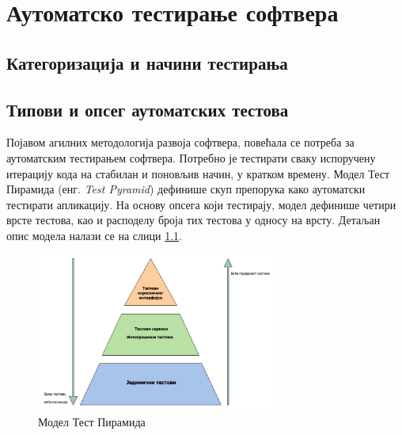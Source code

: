 \documentclass[12pt,oneside]{memoir}
\begin{document}




\chapter{Аутоматско тестирање софтвера}
\label{chp:testiranje}







\section{Категоризација и начини тестирања}





\section{Типови и опсег аутоматских тестова}

Појавом агилних методологија развоја софтвера, повећала се потреба за аутоматским тестирањем софтвера. Потребно је тестирати сваку испоручену итерацију кода на стабилан и поновљив начин, у кратком времену. Модел Тест Пирамида (енг. \textit{Test Pyramid}) дефинише скуп препорука како аутоматски тестирати апликацију. На основу опсега који тестирају, модел дефинише четири врсте тестова, као и расподелу броја тих тестова у односу на врсту. 
Детаљан опис модела налази се на слици \ref{fig:piramida}.

\begin{figure}[!ht]
  \centering
  \includegraphics[width=0.7\textwidth]{matfmaster/img/piramida.png}
  \caption{Модел Тест Пирамида}
  \label{fig:piramida}
\end{figure}
\end{document}
